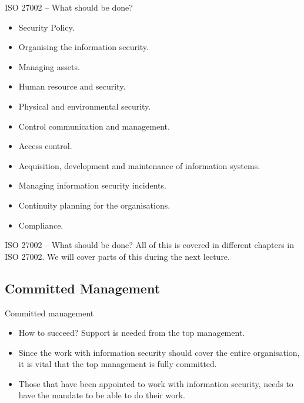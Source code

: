 \documentclass{beamer}
\begin{document}
\begin{frame}{ISO 27002 -- What should be done?}
  \begin{itemize}
    \item Security Policy.
    \item Organising the information security.
    \item Managing assets.
    \item Human resource and security.
    \item Physical and environmental security.
    \item Control communication and management.
    \item Access control.
    \item Acquisition, development and maintenance of information systems.
    \item Managing information security incidents.
    \item Continuity planning for the organisations.
    \item Compliance.
  \end{itemize}
\end{frame}

\begin{frame}{ISO 27002 -- What should be done?}
  All of this is covered in different chapters in ISO 27002. We will cover parts
  of this during the next lecture.
\end{frame}

\subsection{Committed Management}

\begin{frame}{Committed management}
  \begin{itemize}
    \item How to succeed?
      Support is needed from the top management.

    \item Since the work with information security should cover the entire
      organisation, it is vital that the top management is fully committed.

    \item Those that have been appointed to work with information security,
      needs to have the mandate to be able to do their work.

  \end{itemize}
\end{frame}
\end{document}
